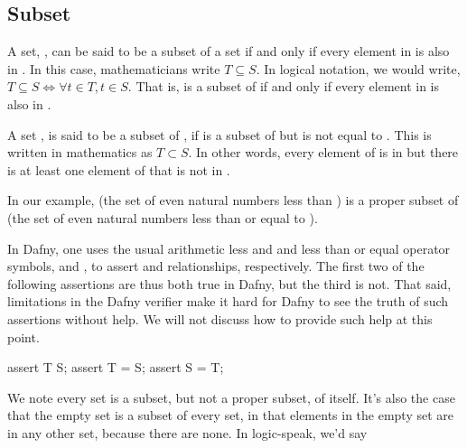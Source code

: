 \documentclass[letterpaper,10pt,english]{sphinxmanual}
\begin{document}
\subsection{Subset}
\label{\detokenize{07-set-theory:subset}}
A set, , can be said to be a subset of a set  if and only if
every element in  is also in . In this case, mathematicians
write \(T \subseteq S\). In logical notation, we would write,
\(T \subseteq S \iff \forall t \in T, t \in S\). That is,  is a
subset of  if and only if every element in  is also in .

A set , is said to be a  subset of , if  is a subset
of  but  is not equal to . This is written in mathematics as
\(T \subset S\). In other words, every element of  is in  but
there is at least one element of  that is not in .

In our example,  (the set of even natural numbers less than )
is a proper subset of  (the set of even natural numbers less than
or equal to ).

In Dafny, one uses the usual arithmetic less and and less than or
equal operator symbols, \sphinxstyleemphasis{\textless{}} and \sphinxstyleemphasis{\textless{}=}, to assert  and
 relationships, respectively. The first two of the following
assertions are thus both true in Dafny, but the third is not. That
said, limitations in the Dafny verifier make it hard for Dafny to see
the truth of such assertions without help. We will not discuss how to
provide such help at this point.

\begin{sphinxVerbatim}[commandchars=\\\{\}]
assert T \PYGZlt{} S;
assert T \PYGZlt{}= S;
assert S \PYGZlt{}= T;
\end{sphinxVerbatim}

We note every set is a subset, but not a proper subset, of
itself. It’s also the case that the empty set is a subset of every
set, in that  elements in the empty set are in any other set,
because there are none. In logic-speak, we’d say 
\end{document}
